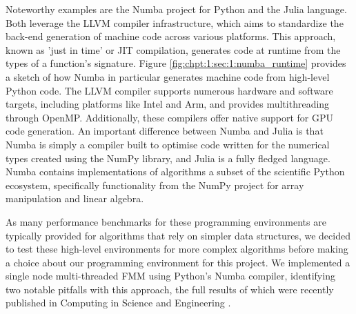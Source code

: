 Noteworthy examples are the Numba project for Python and the Julia language. Both leverage the LLVM compiler infrastructure, which aims to standardize the back-end generation of machine code across various platforms. This approach, known as 'just in time' or JIT compilation, generates code at runtime from the types of a function's signature. Figure \ref{fig:chpt:1:sec:1:numba_runtime} provides a sketch of how Numba in particular generates machine code from high-level Python code. The LLVM compiler supports numerous hardware and software targets, including platforms like Intel and Arm, and provides multithreading through OpenMP. Additionally, these compilers offer native support for GPU code generation. An important difference between Numba and Julia is that Numba is simply a compiler built to optimise code written for the numerical types created using the NumPy library, and Julia is a fully fledged language. Numba contains implementations of algorithms a subset of the scientific Python ecosystem, specifically functionality from the NumPy project for array manipulation and linear algebra.


As many performance benchmarks for these programming environments are typically provided for algorithms that rely on simpler data structures, we decided to test these high-level environments for more complex algorithms before making a choice about our programming environment for this project. We implemented a single node multi-threaded FMM using Python's Numba compiler, identifying two notable pitfalls with this approach, the full results of which were recently published in Computing in Science and Engineering \cite{kailasa2022pyexafmm}.

